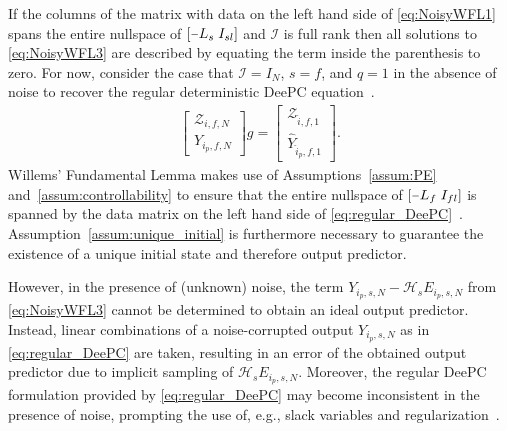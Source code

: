 If the columns of the matrix with data on the left hand side of \eqref{eq:NoisyWFL1} spans the entire nullspace of $\left[\shortminus L_s\;I_{sl}\right]$ and $\mathcal{I}$ is full rank then all solutions to \eqref{eq:NoisyWFL3} are described by equating the term inside the parenthesis to zero. For now, consider the case that $\mathcal{I}=I_N$, $s=f$, and $q=1$ in the absence of noise to recover the regular deterministic \ac{DeePC} equation~\citep{Coulson2019}. %
\begin{align}\label{eq:regular_DeePC}
    \begin{bmatrix}
        \mathcal{Z}_{i,f,N}\\
        Y_{i_p,f,N}
    \end{bmatrix}g=%
    \begin{bmatrix}
        \mathcal{Z}_{\hat{i},f,1}\\
        \widehat{Y}_{\hat{i}_p,f,1}
    \end{bmatrix}.
\end{align}
Willems' Fundamental Lemma makes use of Assumptions~\ref{assum:PE} and~\ref{assum:controllability} to ensure that the entire nullspace of $\left[\shortminus L_f\;I_{fl}\right]$ is spanned by the data matrix on the left hand side of \eqref{eq:regular_DeePC}~\citep{Willems2005}. Assumption~\ref{assum:unique_initial} is furthermore necessary to guarantee the existence of a unique initial state and therefore output predictor. %

However, in the presence of (unknown) noise, the term $Y_{i_p,s,N}-\mathcal{H}_s E_{i_p,s,N}$ from \eqref{eq:NoisyWFL3} cannot be determined to obtain an ideal output predictor. Instead, linear combinations of a noise-corrupted output $Y_{i_p,s,N}$ as in \eqref{eq:regular_DeePC} are taken, resulting in an error of the obtained output predictor due to implicit sampling of $\mathcal{H}_s E_{i_p,s,N}$. Moreover, the regular \ac{DeePC} formulation provided by \eqref{eq:regular_DeePC} may become inconsistent in the presence of noise, prompting the use of, e.g., slack variables and regularization~\cite{Coulson2019}.
%
